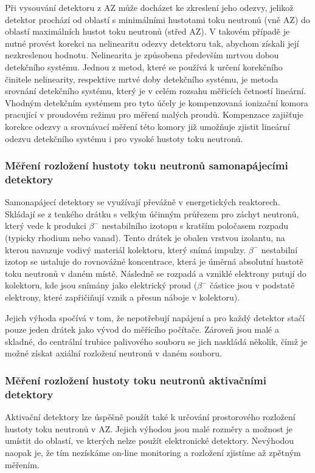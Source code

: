Při vysouvání detektoru z AZ může docházet ke zkreslení jeho odezvy, jelikož detektor prochází od oblastí s minimálními hustotami toku neutronů (vně AZ) do oblastí maximálních hustot toku neutronů (střed AZ). V takovém případě je nutné provést korekci na nelinearitu odezvy detektoru tak, abychom získali její nezkreslenou hodnotu. Nelinearita je způsobena především mrtvou dobou detekčního systému. Jednou z metod, které se používá k určení korekčního činitele nelinearity, respektive mrtvé doby detekčního systému, je metoda srovnání detekčního systému, který je v celém rozsahu měřicích četností lineární. Vhodným detekčním systémem pro tyto účely je kompenzovaná ionizační komora pracující v proudovém režimu pro měření malých proudů. Kompenzace zajišťuje korekce odezvy a srovnávací měření této komory již umožňuje zjistit lineární odezvu detekčního systému i pro vysoké hustoty toku neutronů.

\subsubsection{Měření rozložení hustoty toku neutronů samonapájecími detektory}

Samonapájecí detektory se využívají převážně v energetických reaktorech. Skládají se z tenkého drátku s velkým účinným průřezem pro záchyt neutronů, který vede k produkci $\beta^-$ nestabilního izotopu s kratším poločasem rozpadu (typicky rhodium nebo vanad). Tento drátek je obalen vrstvou izolantu, na kterou navazuje vodivý materiál kolektoru, který snímá impulzy. $\beta^-$ nestabilní izotop se ustaluje do rovnovážné koncentrace, která je úměrná absolutní hustotě toku neutronů v daném místě. Následně se rozpadá a vzniklé elektrony putují do kolektoru, kde jsou snímány jako elektrický proud ($\beta^-$ částice jsou v podstatě elektrony, které zapřičiňují vznik a přesun náboje v kolektoru).

Jejich výhoda spočívá v tom, že nepotřebují napájení a pro každý detektor stačí pouze jeden drátek jako vývod do měřícího počítače. Zároveň jsou malé a skladné, do centrální trubice palivového souboru se jich naskládá několik, čímž je možné získat axiální rozložení neutronů v daném souboru.

\subsubsection{Měření rozložení hustoty toku neutronů aktivačními detektory}

Aktivační detektory lze úspěšně použít také k určování prostorového rozložení hustoty toku neutronů v AZ. Jejich výhodou jsou malé rozměry a možnost je umístit do oblastí, ve kterých nelze použít elektronické detektory. Nevýhodou naopak je, že tím nezískáme on-line monitoring a rozložení zjistíme až zpětným měřením.

